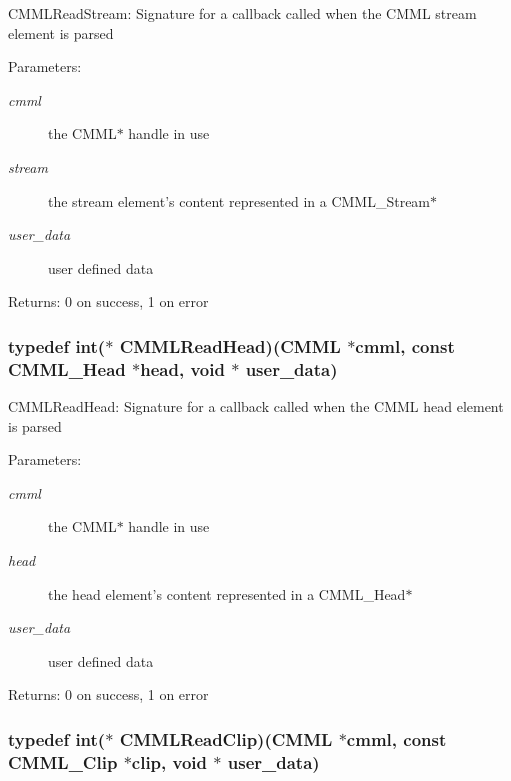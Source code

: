 CMMLRead\-Stream: Signature for a callback called when the CMML stream element is parsed

\begin{Desc}
\item[Parameters:]
\begin{description}
\item[{\em cmml}]the CMML$\ast$ handle in use \item[{\em stream}]the stream element's content represented in a CMML\_\-Stream$\ast$ \item[{\em user\_\-data}]user defined data\end{description}
\end{Desc}
\begin{Desc}
\item[Returns:]0 on success, 1 on error \end{Desc}
\subsubsection{\setlength{\rightskip}{0pt plus 5cm}typedef int($\ast$ {\bf CMMLRead\-Head})({\bf CMML} $\ast$cmml, const {\bf CMML\_\-Head} $\ast$head, void $\ast$ user\_\-data)}\label{cmml_8h_a9}


CMMLRead\-Head: Signature for a callback called when the CMML head element is parsed

\begin{Desc}
\item[Parameters:]
\begin{description}
\item[{\em cmml}]the CMML$\ast$ handle in use \item[{\em head}]the head element's content represented in a CMML\_\-Head$\ast$ \item[{\em user\_\-data}]user defined data\end{description}
\end{Desc}
\begin{Desc}
\item[Returns:]0 on success, 1 on error \end{Desc}
\subsubsection{\setlength{\rightskip}{0pt plus 5cm}typedef int($\ast$ {\bf CMMLRead\-Clip})({\bf CMML} $\ast$cmml, const {\bf CMML\_\-Clip} $\ast$clip, void $\ast$ user\_\-data)}\label{cmml_8h_a10}


